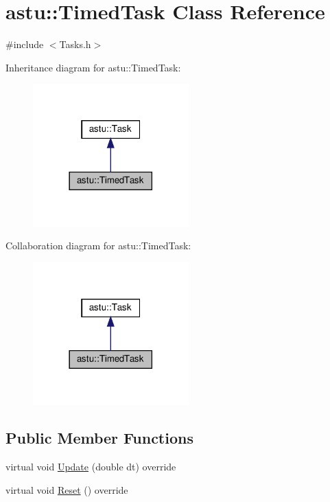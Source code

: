 \hypertarget{classastu_1_1TimedTask}{}\section{astu\+:\+:Timed\+Task Class Reference}
\label{classastu_1_1TimedTask}


{\ttfamily \#include $<$Tasks.\+h$>$}



Inheritance diagram for astu\+:\+:Timed\+Task\+:\nopagebreak
\begin{figure}[H]
\begin{center}
\leavevmode
\includegraphics[width=170pt]{classastu_1_1TimedTask__inherit__graph}
\end{center}
\end{figure}


Collaboration diagram for astu\+:\+:Timed\+Task\+:\nopagebreak
\begin{figure}[H]
\begin{center}
\leavevmode
\includegraphics[width=170pt]{classastu_1_1TimedTask__coll__graph}
\end{center}
\end{figure}
\subsection*{Public Member Functions}
\begin{DoxyCompactItemize}
\item 
virtual void \hyperlink{classastu_1_1TimedTask_a5e850f0352294d2c9b302e1a56c6eb09}{Update} (double dt) override
\item 
virtual void \hyperlink{classastu_1_1TimedTask_ac885f7d65aab450125fc4e00eb045a82}{Reset} () override
\end{DoxyCompactItemize}
